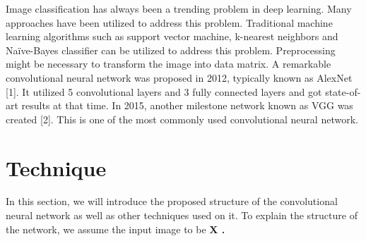 \documentclass[twoside,twocolumn]{article}
\begin{document}
Image classification has always been a trending problem in deep learning. Many approaches have been utilized to address this problem. Traditional machine learning algorithms such as support vector machine, k-nearest neighbors and Naïve-Bayes classifier can be utilized to address this problem. Preprocessing might be necessary to transform the image into data matrix. A remarkable convolutional neural network was proposed in 2012, typically known as AlexNet [1]. It utilized 5 convolutional layers and 3 fully connected layers and got state-of-art results at that time. In 2015, another milestone network known as VGG was created [2]. This is one of the most commonly used convolutional neural network.



\section{Technique}

In this section, we will introduce the proposed structure of the convolutional neural network as well as other techniques used on it. To explain the structure of the network, we assume the input image to be \bf X \rm. 
\end{document}
